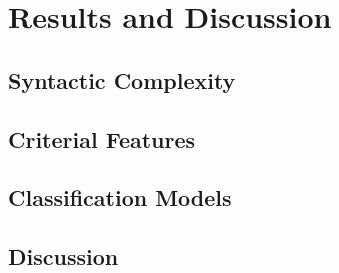 \chapter{Results and Discussion}
\section{Syntactic Complexity}
\section{Criterial Features}
\section{Classification Models}
\section{Discussion}
